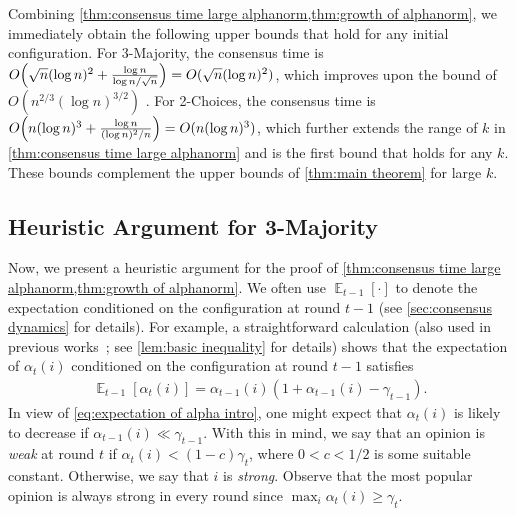 \documentclass[letterpaper,11pt]{article}
\DeclareMathOperator*{\E}{\mathbb{E}}
\newcommand{\alphanorm}{\gamma}
\begin{document}
Combining \cref{thm:consensus time large alphanorm,thm:growth of alphanorm}, 
we immediately obtain the following upper bounds that hold for any initial configuration.
For 3-Majority, the consensus time is $O\qty(\sqrt{n}(\log n)^2+ \frac{\log n}{\log n/\sqrt{n}})=O(\sqrt{n}(\log n)^2)$, which improves upon the bound of $O(n^{2/3}(\log n)^{3/2})$ \cite{nearly_tight_analysis,ignore_or_comply}.
For 2-Choices, the consensus time is $O\qty(n(\log n)^3+ \frac{\log n}{ (\log n)^2/n})=O(n(\log n)^3)$, which further extends the range of $k$ in \cref{thm:consensus time large alphanorm} and is the first bound that holds for any $k$.
These bounds complement the upper bounds of \cref{thm:main theorem} for large $k$.

\subsection{Heuristic Argument for 3-Majority} \label{sec:heuristic argument}
Now, we present a heuristic argument for the proof of \cref{thm:consensus time large alphanorm,thm:growth of alphanorm}. 
We often use $\E_{t-1}[\cdot]$ to denote the expectation conditioned on the configuration at round $t-1$ (see \cref{sec:consensus dynamics} for details).
For example, a straightforward calculation (also used in previous works~\cite{simple_dynamics,stabilizing_consensus,nearly_tight_analysis,ignore_or_comply}; see \cref{lem:basic inequality} for details) shows that the expectation of $\alpha_t(i)$ conditioned on the configuration at round $t-1$ satisfies
\begin{align}
  \E_{t-1}[\alpha_t(i)] = \alpha_{t-1}(i)(1+\alpha_{t-1}(i) - \alphanorm_{t-1}) \label{eq:expectation of alpha intro}.
\end{align}
In view of \cref{eq:expectation of alpha intro}, one might expect that $\alpha_t(i)$ is likely to decrease if $\alpha_{t-1}(i) \ll \alphanorm_{t-1}$.
With this in mind, we say that an opinion is \emph{weak} at round $t$ if $\alpha_t(i) < (1-c)\alphanorm_t$, where $0<c<1/2$ is some suitable constant. Otherwise, we say that $i$ is \emph{strong}.
Observe that the most popular opinion is always strong in every round since $\max_i \alpha_t(i) \ge \alphanorm_t$.
\end{document}
